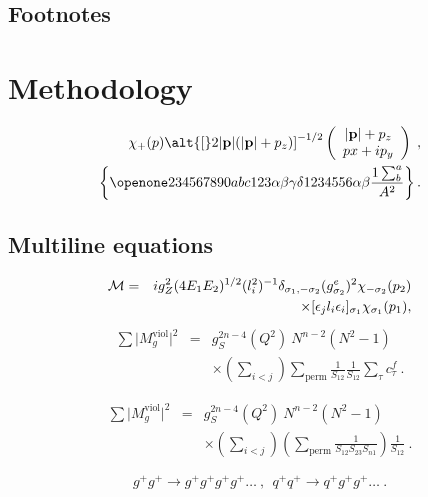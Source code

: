 \documentclass[%
 reprint,
 amsmath,amssymb,
 aps,
 floatfix,
]{revtex4-2}
\begin{document}
\subsection{Footnotes}%

\section{Methodology}


\begin{eqnarray}
\chi_+(p)\alt{\bf [}2|{\bf p}|(|{\bf p}|+p_z){\bf ]}^{-1/2}
\left(
\begin{array}{c}
|{\bf p}|+p_z\\
px+ip_y
\end{array}\right)\;,
\\
\left\{%
 \openone234567890abc123\alpha\beta\gamma\delta1234556\alpha\beta
 \frac{1\sum^{a}_{b}}{A^2}%
\right\}%
\label{eq:one}.
\end{eqnarray}

\subsection{Multiline equations}

\begin{eqnarray}
{\cal M}=&&ig_Z^2(4E_1E_2)^{1/2}(l_i^2)^{-1}
\delta_{\sigma_1,-\sigma_2}
(g_{\sigma_2}^e)^2\chi_{-\sigma_2}(p_2)\nonumber\\
&&\times
[\epsilon_jl_i\epsilon_i]_{\sigma_1}\chi_{\sigma_1}(p_1),
\end{eqnarray}
\begin{eqnarray}
\sum \vert M^{\text{viol}}_g \vert ^2&=&g^{2n-4}_S(Q^2)~N^{n-2}
        (N^2-1)\nonumber \\
 & &\times \left( \sum_{i<j}\right)
  \sum_{\text{perm}}
 \frac{1}{S_{12}}
 \frac{1}{S_{12}}
 \sum_\tau c^f_\tau~.
\end{eqnarray}

\begin{eqnarray*}
\sum \vert M^{\text{viol}}_g \vert ^2&=&g^{2n-4}_S(Q^2)~N^{n-2}
        (N^2-1)\\
 & &\times \left( \sum_{i<j}\right)
 \left(
  \sum_{\text{perm}}\frac{1}{S_{12}S_{23}S_{n1}}
 \right)
 \frac{1}{S_{12}}~.
\end{eqnarray*}

\begin{equation}
g^+g^+ \rightarrow g^+g^+g^+g^+ \dots ~,~~q^+q^+\rightarrow
q^+g^+g^+ \dots ~. \tag{2.6$'$}\label{eq:mynum}
\end{equation}
\end{document}
